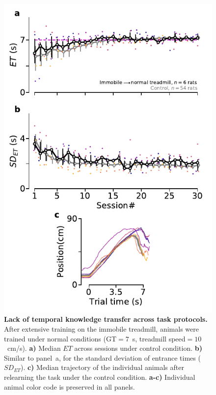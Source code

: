 \begin{figure}[!h]
  \begin{center}
    \includegraphics[scale=1]{ch-appendicies/figures/Imm2CtrlTrd.pdf}
    \caption[Immobile Animals Relearning the Task]
    {\textbf{Lack of temporal knowledge transfer across task protocols.}
    After extensive training on the immobile treadmill, animals were trained under normal conditions (GT$=7$~s, treadmill speed$=10$~cm/s).
    \textbf{a)}
    Median $ET$ across sessions under control condition.
    \textbf{b)}
    Similar to panel~a, for the standard deviation of entrance times ($SD_{ET}$).
    \textbf{c)}
    Median trajectory of the individual animals after relearning the task under the control condition.
    \textbf{a-c)}
    Individual animal color code is preserved in all panels.
    }
    \label{fig:appendix:Imm2Ctrl}
  \end{center}
\end{figure}